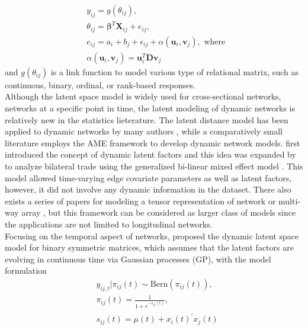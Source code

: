 \documentclass[a4paper]{article}
\begin{document}
	\begin{equation*}\label{AME}
		\begin{aligned}
			&y_{ij} = g(\theta_{ij}),\\
			& \theta_{ij} = \boldsymbol{\beta}^T\boldsymbol{X}_{ij} + e_{ij},\\
			& e_{ij} = a_i + b_j + \epsilon_{ij} + \alpha(\boldsymbol{u}_i, \boldsymbol{v}_j), \mbox{ where }\\
			& \alpha(\boldsymbol{u}_i, \boldsymbol{v}_j) = \boldsymbol{u}_i^T\boldsymbol{D}\boldsymbol{v}_j
		\end{aligned}
	\end{equation*}
	and $ g(\theta_{ij})$ is a link function to model various type of relational matrix, such as continuous, binary, ordinal, or rank-based responses.\\ \newline
	Although the latent space model is widely used for cross-sectional networks, networks at a specific point in time, the latent modeling of dynamic networks is relatively new in the statistics lieterature. The latent distance model has been applied to dynamic networks by many authors \citep{sarkar2005dynamic,sarkar2007latent,sewell2015latent,sewell2016latent,friel2016interlocking}, while a comparatively small literature employs the AME framework to develop dynamic network models. \citealp{ward2007persistent} first introduced the concept of dynamic latent factors and this idea was expanded by \cite{ward2013gravity} to analyze bilateral trade using the generalized bi-linear mixed effect model \citep{hoff2005bilinear}. This model allowed time-varying edge covariate parameters as well as latent factors, however, it did not involve any dynamic information in the dataset. There also exists a series of papers for modeling a tensor representation of network or multi-way array  \citep{hoff2011hierarchical,hoff2011separable,hoff2015multilinear,minhas2016new}, but this framework can be considered as larger class of models since the applications are not limited to longitudinal networks.
		\\ \newline Focusing on the temporal aspect of networks, \cite{durante2013nonparametric} proposed the dynamic latent space model for binary symmetric matrices, which 
		assumes that the latent factors are evolving in continuous time via Gaussian processes (GP), with the model formulation
		\begin{equation*}\label{DuranteDunson}
			\begin{aligned}
				&y_{ij, t}|\pi_{ij}(t) \sim \mbox{Bern}(\pi_{ij}(t)),\\
				& \pi_{ij}(t) = \frac{1}{1+e^{-s_{ij}(t)}},\\
				& s_{ij}(t) = \mu(t) + x_i(t)^\prime x_j(t)
			\end{aligned}
		\end{equation*}
\end{document}
